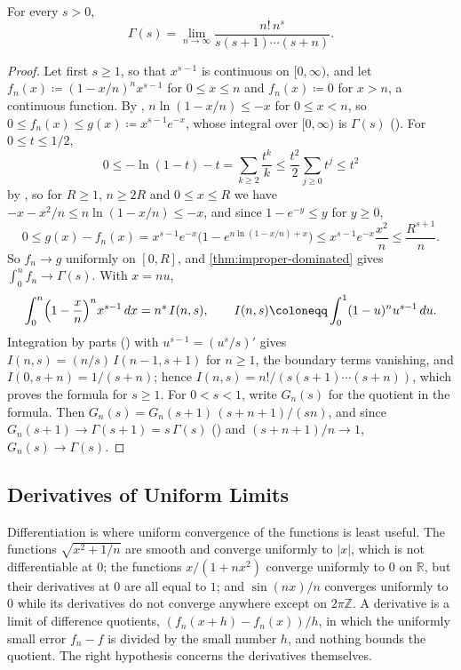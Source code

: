 \begin{proposition}
\label{prop:gauss-gamma}
For every $s>0$,
\[
\Gamma(s)=\lim_{n\to\infty}\frac{n!\,n^s}{s(s+1)\cdots(s+n)} .
\]
\end{proposition}

\begin{proof}
Let first $s\ge1$, so that $x^{s-1}$ is continuous on $[0,\infty)$, and let $f_n(x)\coloneqq(1-x/n)^nx^{s-1}$ for $0\le x\le n$ and $f_n(x)\coloneqq0$ for $x>n$, a continuous function. By , $n\ln(1-x/n)\le-x$ for $0\le x<n$, so $0\le f_n(x)\le g(x)\coloneqq x^{s-1}e^{-x}$, whose integral over $[0,\infty)$ is $\Gamma(s)$ (). For $0\le t\le1/2$,
\[
0\le-\ln(1-t)-t=\sum_{k\ge2}\frac{t^k}k\le\frac{t^2}2\sum_{j\ge0}t^j\le t^2
\]
by , so for $R\ge1$, $n\ge2R$ and $0\le x\le R$ we have $-x-x^2/n\le n\ln(1-x/n)\le-x$, and since $1-e^{-y}\le y$ for $y\ge0$,
\[
0\le g(x)-f_n(x)=x^{s-1}e^{-x}\bigl(1-e^{n\ln(1-x/n)+x}\bigr)\le x^{s-1}e^{-x}\frac{x^2}n\le\frac{R^{s+1}}n .
\]
So $f_n\to g$ uniformly on $[0,R]$, and \cref{thm:improper-dominated} gives $\int_0^nf_n\to\Gamma(s)$. With $x=nu$,
\[
\int_0^n\Bigl(1-\frac xn\Bigr)^nx^{s-1}\,dx=n^s\,I(n,s),\qquad I(n,s)\coloneqq\int_0^1(1-u)^nu^{s-1}\,du .
\]
Integration by parts () with $u^{s-1}=(u^s/s)'$ gives $I(n,s)=(n/s)\,I(n-1,s+1)$ for $n\ge1$, the boundary terms vanishing, and $I(0,s+n)=1/(s+n)$; hence $I(n,s)=n!/(s(s+1)\cdots(s+n))$, which proves the formula for $s\ge1$. For $0<s<1$, write $G_n(s)$ for the quotient in the formula. Then $G_n(s)=G_n(s+1)\,(s+n+1)/(sn)$, and since $G_n(s+1)\to\Gamma(s+1)=s\,\Gamma(s)$ () and $(s+n+1)/n\to1$, $G_n(s)\to\Gamma(s)$.
\end{proof}

\subsection{Derivatives of Uniform Limits}

Differentiation is where uniform convergence of the functions is least useful. The functions $\sqrt{x^2+1/n}$ are smooth and converge uniformly to $|x|$, which is not differentiable at $0$; the functions $x/(1+nx^2)$ converge uniformly to $0$ on $\mathbb R$, but their derivatives at $0$ are all equal to $1$; and $\sin(nx)/n$ converges uniformly to $0$ while its derivatives do not converge anywhere except on $2\pi\mathbb Z$. A derivative is a limit of difference quotients, $(f_n(x+h)-f_n(x))/h$, in which the uniformly small error $f_n-f$ is divided by the small number $h$, and nothing bounds the quotient. The right hypothesis concerns the derivatives themselves.

